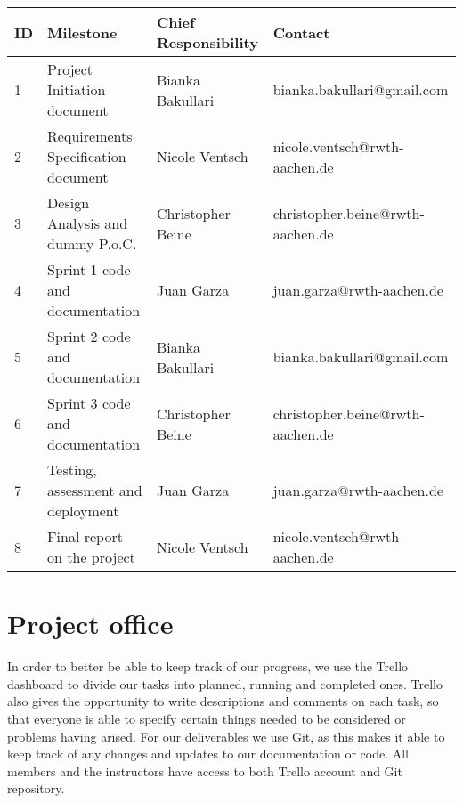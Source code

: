 \documentclass[notitlepage]{article}
\begin{document}
\begin{flushleft}
\begin{center}
  \begin{tabular}{ m{0.4cm} m{5cm} m{5cm} m{6cm} }
  	\hline
		ID & Milestone & Chief Responsibility & Contact \\ \hline
		1 & Project Initiation document & Bianka Bakullari & bianka.bakullari@gmail.com \\ \hline
		2 & Requirements Specification document & Nicole Ventsch & nicole.ventsch@rwth-aachen.de \\ \hline
		3 & Design Analysis and dummy P.o.C. & Christopher Beine & christopher.beine@rwth-aachen.de \\ \hline
		4 & Sprint 1 code and documentation & Juan Garza  & 
		juan.garza@rwth-aachen.de
		\\ \hline
		5 & Sprint 2 code and documentation & Bianka Bakullari & bianka.bakullari@gmail.com \\ \hline
		6 & Sprint 3 code and documentation & Christopher Beine & christopher.beine@rwth-aachen.de \\ \hline
		7 & Testing, assessment and deployment & Juan Garza & 
		juan.garza@rwth-aachen.de 
		\\ \hline
		8 & Final report on the project & Nicole Ventsch & nicole.ventsch@rwth-aachen.de \\ \hline
	\end{tabular}
\end{center}













\section{Project office}

In order to better be able to keep track of our progress, we use the Trello dashboard to divide our tasks into planned, running and completed ones.
Trello also gives the opportunity to write descriptions and comments on each task, so that everyone is able to specify certain things needed to be considered or problems having arised.
For our deliverables we use Git, as this makes it able to keep track of any changes and updates to our documentation or code.
All members and the instructors have access to both Trello account and Git repository.

%
%  




\end{flushleft}
%
\end{document}
